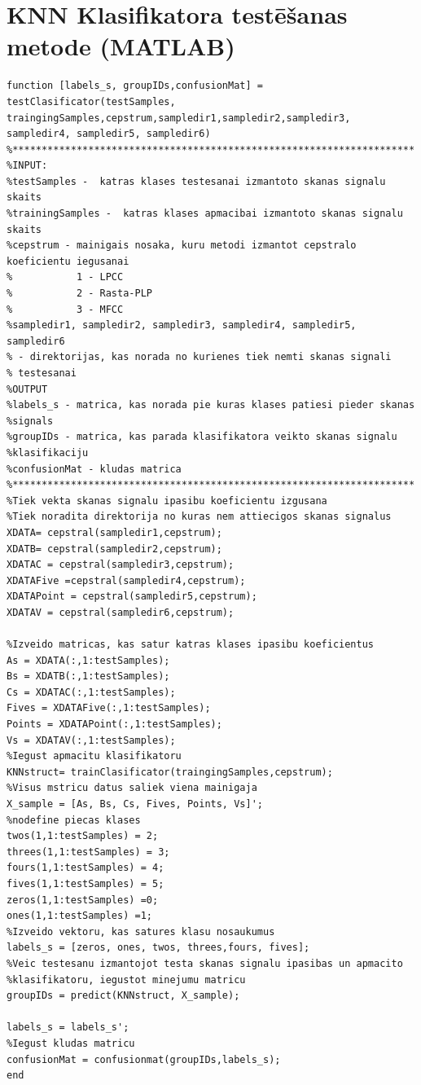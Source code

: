 \documentclass[12pt,paper=A4]{report}
\begin{document}
\section{KNN Klasifikatora testēšanas metode (MATLAB)}
\label{appendix:piel5}
\begin{lstlisting}
function [labels_s, groupIDs,confusionMat] = testClasificator(testSamples, traingingSamples,cepstrum,sampledir1,sampledir2,sampledir3, sampledir4, sampledir5, sampledir6)
%*********************************************************************
%INPUT:
%testSamples -  katras klases testesanai izmantoto skanas signalu skaits
%trainingSamples -  katras klases apmacibai izmantoto skanas signalu skaits
%cepstrum - mainigais nosaka, kuru metodi izmantot cepstralo koeficientu iegusanai
%           1 - LPCC
%           2 - Rasta-PLP
%           3 - MFCC
%sampledir1, sampledir2, sampledir3, sampledir4, sampledir5, sampledir6
% - direktorijas, kas norada no kurienes tiek nemti skanas signali
% testesanai
%OUTPUT
%labels_s - matrica, kas norada pie kuras klases patiesi pieder skanas
%signals
%groupIDs - matrica, kas parada klasifikatora veikto skanas signalu
%klasifikaciju
%confusionMat - kludas matrica
%*********************************************************************
%Tiek vekta skanas signalu ipasibu koeficientu izgusana
%Tiek noradita direktorija no kuras nem attiecigos skanas signalus
XDATA= cepstral(sampledir1,cepstrum);
XDATB= cepstral(sampledir2,cepstrum);
XDATAC = cepstral(sampledir3,cepstrum);
XDATAFive =cepstral(sampledir4,cepstrum);
XDATAPoint = cepstral(sampledir5,cepstrum);
XDATAV = cepstral(sampledir6,cepstrum);

%Izveido matricas, kas satur katras klases ipasibu koeficientus
As = XDATA(:,1:testSamples);
Bs = XDATB(:,1:testSamples);
Cs = XDATAC(:,1:testSamples);
Fives = XDATAFive(:,1:testSamples);
Points = XDATAPoint(:,1:testSamples);
Vs = XDATAV(:,1:testSamples);
%Iegust apmacitu klasifikatoru 
KNNstruct= trainClasificator(traingingSamples,cepstrum);
%Visus mstricu datus saliek viena mainigaja
X_sample = [As, Bs, Cs, Fives, Points, Vs]';
%nodefine piecas klases
twos(1,1:testSamples) = 2;
threes(1,1:testSamples) = 3;
fours(1,1:testSamples) = 4;
fives(1,1:testSamples) = 5;
zeros(1,1:testSamples) =0;
ones(1,1:testSamples) =1;
%Izveido vektoru, kas satures klasu nosaukumus 
labels_s = [zeros, ones, twos, threes,fours, fives];
%Veic testesanu izmantojot testa skanas signalu ipasibas un apmacito
%klasifikatoru, iegustot minejumu matricu 
groupIDs = predict(KNNstruct, X_sample);

labels_s = labels_s';
%Iegust kludas matricu 
confusionMat = confusionmat(groupIDs,labels_s);
end
\end{lstlisting}
\end{document}
